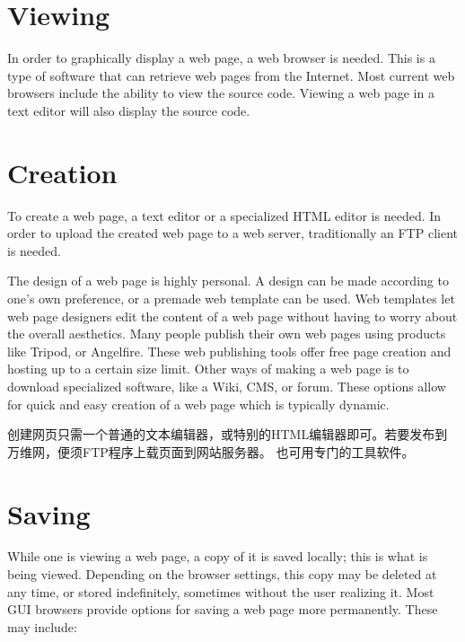 \section{Viewing}


In order to graphically display a web page, a web browser is needed. This is a type of software that can retrieve web pages from the Internet. Most current web browsers include the ability to view the source code. Viewing a web page in a text editor will also display the source code.




\section{Creation}


To create a web page, a text editor or a specialized HTML editor is needed. In order to upload the created web page to a web server, traditionally an FTP client is needed.

The design of a web page is highly personal. A design can be made according to one's own preference, or a premade web template can be used. Web templates let web page designers edit the content of a web page without having to worry about the overall aesthetics. Many people publish their own web pages using products like Tripod, or Angelfire. These web publishing tools offer free page creation and hosting up to a certain size limit. Other ways of making a web page is to download specialized software, like a Wiki, CMS, or forum. These options allow for quick and easy creation of a web page which is typically dynamic.

创建网页只需一个普通的文本编辑器，或特别的HTML编辑器即可。若要发布到万维网，便须FTP程序上载页面到网站服务器。 也可用专门的工具软件。




\section{Saving}


While one is viewing a web page, a copy of it is saved locally; this is what is being viewed. Depending on the browser settings, this copy may be deleted at any time, or stored indefinitely, sometimes without the user realizing it. Most GUI browsers provide options for saving a web page more permanently. These may include:

